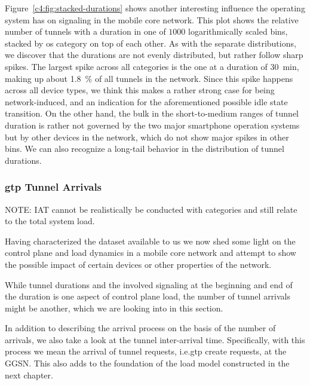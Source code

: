 Figure~\ref{c4:fig:stacked-durations} shows another interesting influence the operating system has on signaling in the mobile core network. This plot shows the relative number of tunnels with a duration in one of $1000$ logarithmically scaled bins, stacked by \gls{os} category on top of each other. As with the separate distributions, we discover that the durations are not evenly distributed, but rather follow sharp spikes. The largest spike across all categories is the one at a duration of \SI{30}{\minute}, making up about \SI{1.8}{\percent} of all tunnels in the network. Since this spike happens across all device types, we think this makes a rather strong case for being network-induced, and an indication for the aforementioned possible idle state transition. On the other hand, the bulk in the short-to-medium ranges of tunnel duration is rather not governed by the two major smartphone operation systems but by other devices in the network, which do not show major spikes in other bins. We can also recognize a long-tail behavior in the distribution of tunnel durations.






\subsubsection{\texorpdfstring{\acrshort{gtp}}{GTP} Tunnel Arrivals}

NOTE: IAT cannot be realistically be conducted with categories and still relate to the total system load.

Having characterized the dataset available to us we now shed some light on the control plane and load dynamics in a mobile core network and attempt to show the possible impact of certain devices or other properties of the network. 



While tunnel durations and the involved signaling at the beginning and end of the duration is one aspect of control plane load, the number of tunnel arrivals might be another, which we are looking into in this section.

In addition to describing the arrival process on the basis of the number of arrivals, we also take a look at the tunnel inter-arrival time. Specifically, with this process we mean the arrival of tunnel requests, i.e.\gls{gtp} create requests, at the \gls{GGSN}. This also adds to the foundation of the load model constructed in the next chapter. 

